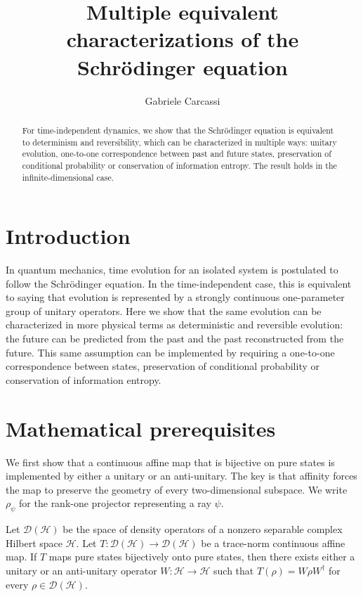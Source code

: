 \documentclass{techbrief}
\title{Multiple equivalent characterizations of the Schrödinger equation}
\author{Gabriele Carcassi}
\begin{document}
\maketitle

\begin{abstract}
	For time-independent dynamics, we show that the Schrödinger equation is equivalent to determinism and reversibility, which can be characterized in multiple ways: unitary evolution, one-to-one correspondence between past and future states, preservation of conditional probability or conservation of information entropy. The result holds in the infinite-dimensional case.
\end{abstract}

\section{Introduction}

In quantum mechanics, time evolution for an isolated system is postulated to follow the Schrödinger equation. In the time-independent case, this is equivalent to saying that evolution is represented by a strongly continuous one-parameter group of unitary operators. Here we show that the same evolution can be characterized in more physical terms as deterministic and reversible evolution: the future can be predicted from the past and the past reconstructed from the future. This same assumption can be implemented by requiring a one-to-one correspondence between states, preservation of conditional probability or conservation of information entropy.

\section{Mathematical prerequisites}

We first show that a continuous affine map that is bijective on pure states is implemented by either a unitary or an anti-unitary. The key is that affinity forces the map to preserve the geometry of every two-dimensional subspace. We write $\rho_\psi$ for the rank-one projector representing a ray $\psi$.

\begin{prop}\label{AFF-PURE}
	Let $\mathcal{D}(\mathcal{H})$ be the space of density operators of a nonzero separable complex Hilbert space $\mathcal{H}$. Let $T:\mathcal{D}(\mathcal{H})\to\mathcal{D}(\mathcal{H})$ be a trace-norm continuous affine map. If $T$ maps pure states bijectively onto pure states, then there exists either a unitary or an anti-unitary operator $W:\mathcal{H}\to\mathcal{H}$ such that $T(\rho)=W\rho W^\dagger$ for every $\rho\in\mathcal{D}(\mathcal{H})$.
\end{prop}
\end{document}
